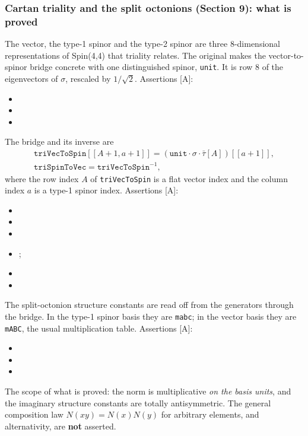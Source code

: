 \subsubsection{Cartan triality and the split octonions (Section 9): what is proved}
\label{fnd:triality}\label{sec:3.1.6}

The vector, the type-1 spinor and the type-2 spinor are three 8-dimensional representations of
Spin(4,4) that triality relates. The original makes the vector-to-spinor bridge concrete with
one distinguished spinor, \texttt{unit}. It is row 8 of the eigenvectors of $\sigma$, rescaled by
$1/\sqrt2$. Assertions [A]:
\begin{itemize}
  \item {}
  \item {}
  \item {}
\end{itemize}
The bridge and its inverse are
\begin{gather}
  \texttt{triVecToSpin}[[A+1,a+1]] = (\texttt{unit}\cdot\sigma\cdot\bar\tau[A])[[a+1]],\\
  \texttt{triSpinToVec}=\texttt{triVecToSpin}^{-1},
\end{gather}
where the row index $A$ of \texttt{triVecToSpin} is a flat vector index and the column index $a$
is a type-1 spinor index.
Assertions [A]:
\begin{itemize}
  \item {}
  \item {}
  \item {}
  \item {}; 
  \item {}
  \item {}
\end{itemize}
The split-octonion structure constants are read off from the generators through the bridge. In
the type-1 spinor basis they are \texttt{mabc}; in the vector basis they are \texttt{mABC}, the
usual multiplication table. Assertions [A]:
\begin{itemize}
  \item {}
  \item {}
  \item {}
\end{itemize}
The scope of what is proved: the norm is multiplicative \emph{on the basis units}, and the
imaginary structure constants are totally antisymmetric. The general composition law
$N(xy)=N(x)N(y)$ for arbitrary elements, and alternativity, are \textbf{not} asserted.

